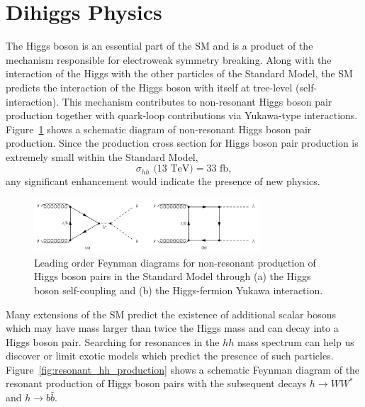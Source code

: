 \section{Dihiggs Physics}
\label{sec:physics}
The Higgs boson is an essential part of the SM and is a product of the mechanism responsible for electroweak symmetry breaking. Along with the interaction of the Higgs with the other particles of the Standard Model, the SM predicts the interaction of the Higgs boson with itself at tree-level (self-interaction). This mechanism contributes to non-resonant Higgs boson pair production together with quark-loop contributions via Yukawa-type interactions. Figure~\ref{fig:nr_hh_production} shows a schematic diagram of non-resonant Higgs boson pair production. Since the production cross section for Higgs boson pair production is extremely small within the Standard Model, 
\begin{equation*}
\sigma_{hh}\text{ (13 TeV)} = 33 \text{ fb},
\end{equation*}
any significant enhancement would indicate the presence of new physics.

\begin{figure}[!h] 
\begin{center}
\includegraphics*[width=0.75\textwidth] {dihiggsPhys/figures/nr-diHiggs-production.png}
\caption{Leading order Feynman diagrams for non-resonant production of Higgs
  boson pairs in the Standard Model through (a) the Higgs boson self-coupling
  and (b) the Higgs-fermion Yukawa interaction.} 
  \label{fig:nr_hh_production}
\end{center}
\end{figure}

Many extensions of the SM predict the existence of additional scalar bosons which may have mass larger than twice the Higgs mass and can decay into a Higgs boson pair. Searching for resonances in the $hh$ mass spectrum can help us discover or limit exotic models which predict the presence of such particles. Figure~\ref{fig:resonant_hh_production} shows a schematic Feynman diagram of the resonant production of Higgs boson pairs with the subsequent decays $h \to WW^{\ast}$ and $h \to b \bar{b}$.


